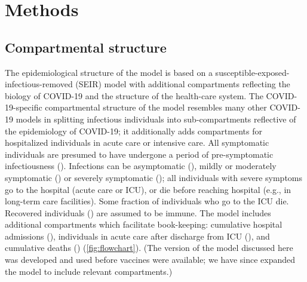 \documentclass[12pt]{article}\usepackage[]{graphicx}\usepackage[]{color}
\begin{document}
\section{Methods}

\subsection*{Compartmental structure}

The epidemiological structure of the model is based on a susceptible-exposed-infectious-removed (SEIR) model with additional compartments reflecting the biology of COVID-19 and the structure of the health-care system. 
The COVID-19-specific compartmental structure of the model resembles many other COVID-19 models \cite{childs2021impact, tuite2020mathematical}  in splitting infectious individuals into sub-compartments reflective of the epidemiology of COVID-19; it additionally adds compartments for hospitalized individuals in acute care or intensive care. 
All symptomatic individuals are presumed to have undergone a period of pre-symptomatic infectiousness (). 
Infections can be asymptomatic (), mildly or moderately symptomatic () or severely symptomatic (); all individuals with severe symptoms go to the hospital (acute care or ICU), or die before reaching hospital (e.g., in long-term care facilities).
Some fraction of individuals who go to the ICU die. Recovered individuals () are assumed to be immune.  
The model includes additional compartments which facilitate book-keeping: cumulative hospital admissions (), individuals in acute care after discharge from ICU (), and cumulative deaths () (\cref{fig:flowchart}).
(The version of the model discussed here was developed and used before vaccines were available; we have since expanded the model to include relevant compartments.)
\end{document}
